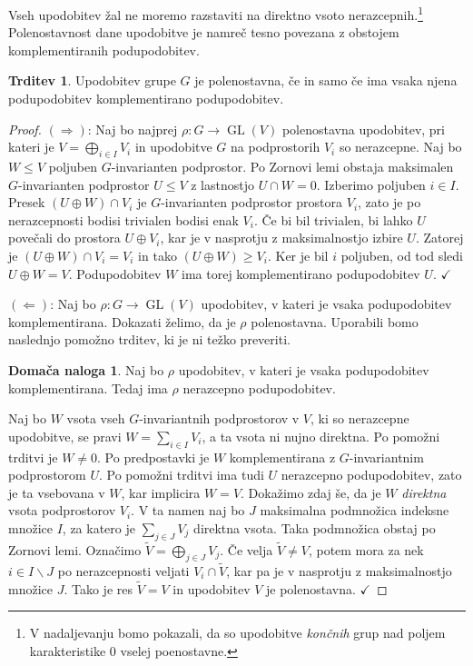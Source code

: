 \documentclass[11pt]{book}
\DeclareMathOperator\GL{GL}
\def\kljuka{$\checkmark$}
\theoremstyle{definition}
\theoremstyle{zgled}
\theoremstyle{odprtproblem}
\theoremstyle{domacanaloga}
\newtheorem*{domacanaloga}{Domača naloga}
\newenvironment{dokaz}
    {\color{siva}\begin{proof}}
    {\end{proof}}
\theoremstyle{izrek}
\newtheorem*{trditev}{Trditev}
\begin{document}
Vseh upodobitev žal ne moremo razstaviti na direktno vsoto nerazcepnih.\footnote{V nadaljevanju bomo pokazali, da so upodobitve \emph{končnih} grup nad poljem karakteristike $0$ vselej poenostavne.} Polenostavnost dane upodobitve je namreč tesno povezana z obstojem komplementiranih podupodobitev.

\begin{trditev}
Upodobitev grupe $G$ je polenostavna, če in samo če ima vsaka njena podupodobitev komplementirano podupodobitev.
\end{trditev}
\begin{dokaz}
$(\Rightarrow)$: Naj bo najprej $\rho \colon G \to \GL(V)$ polenostavna upodobitev, pri kateri je $V = \bigoplus_{i \in I} V_i$ in upodobitve $G$ na podprostorih $V_i$ so nerazcepne. Naj bo $W \leq V$ poljuben $G$-invarianten podprostor. Po Zornovi lemi obstaja maksimalen $G$-invarianten podprostor $U \leq V$ z lastnostjo $U \cap W = 0$. Izberimo poljuben $i \in I$. Presek $(U \oplus W) \cap V_i$ je $G$-invarianten podprostor prostora $V_i$, zato je po nerazcepnosti bodisi trivialen bodisi enak $V_i$. Če bi bil trivialen, bi lahko $U$ povečali do prostora $U \oplus V_i$, kar je v nasprotju z maksimalnostjo izbire $U$. Zatorej je $(U \oplus W) \cap V_i = V_i$ in tako $(U \oplus W) \geq V_i$. Ker je bil $i$ poljuben, od tod sledi $U \oplus W = V$. Podupodobitev $W$ ima torej komplementirano podupodobitev $U$. \kljuka

$(\Leftarrow)$: Naj bo $\rho \colon G \to \GL(V)$ upodobitev, v kateri je vsaka podupodobitev komplementirana. Dokazati želimo, da je $\rho$ polenostavna. Uporabili bomo naslednjo pomožno trditev, ki je ni težko preveriti.

\begin{domacanaloga}
Naj bo $\rho$ upodobitev, v kateri je vsaka podupodobitev komplementirana. Tedaj ima $\rho$ nerazcepno podupodobitev.
\end{domacanaloga}

Naj bo $W$ vsota vseh $G$-invariantnih podprostorov v $V$, ki so nerazcepne upodobitve, se pravi $W = \sum_{i \in I} V_i$, a ta vsota ni nujno direktna. Po pomožni trditvi je $W \neq 0$. Po predpostavki je $W$ komplementirana z $G$-invariantnim podprostorom $U$. Po pomožni trditvi ima tudi $U$ nerazcepno podupodobitev, zato je ta vsebovana v $W$, kar implicira $W = V$. Dokažimo zdaj še, da je $W$ \emph{direktna} vsota podprostorov $V_i$. V ta namen naj bo $J$ maksimalna podmnožica indeksne množice $I$, za katero je $\sum_{j \in J} V_j$ direktna vsota. Taka podmnožica obstaj po Zornovi lemi. Označimo $\tilde V = \bigoplus_{j \in J} V_j$. Če velja $\tilde V \neq V$, potem mora za nek $i \in I \backslash J$ po nerazcepnosti veljati $V_i \cap \tilde V$, kar pa je v nasprotju z maksimalnostjo množice $J$. Tako je res $\tilde V = V$ in upodobitev $V$ je polenostavna. \kljuka
\end{dokaz}
\end{document}
